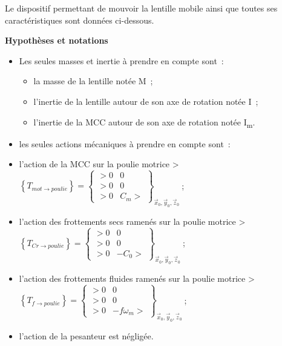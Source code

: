 Le dispositif permettant de mouvoir la lentille mobile ainsi que toutes ses caractéristiques sont données ci-dessous.

\textbf{Hypothèses et notations}

\begin{itemize}
\item
  Les seules masses et inertie à prendre en compte sont~:

  \begin{itemize}
  \item
    la masse de la lentille notée M~;
  \item
    l'inertie de la lentille autour de son axe de rotation notée I~;
  \item
    l'inertie de la MCC autour de son axe de rotation notée I\textsubscript{m}.
  \end{itemize}
\item
  les seules actions mécaniques à prendre en compte sont~:
\end{itemize}

\begin{itemize}
\item
  l'action de la MCC sur la poulie motrice \textgreater{} \(\left\{ T_{mot \rightarrow poulie} \right\} = \begin{Bmatrix} > 0 & 0 \\ > 0 & 0 \\ > 0 & C_{m} > \end{Bmatrix}_{{\overrightarrow{x}}_{0},{\overrightarrow{y}}_{0},{\overrightarrow{z}}_{0}}\ \);
\item
  l'action des frottements secs ramenés sur la poulie motrice \textgreater{} \(\left\{ T_{Cr \rightarrow poulie} \right\} = \begin{Bmatrix} > 0 & 0 \\ > 0 & 0 \\ > 0 & {- C}_{0} > \end{Bmatrix}_{{\overrightarrow{x}}_{0},{\overrightarrow{y}}_{0},{\overrightarrow{z}}_{0}}\ \);
\item
  l'action des frottements fluides ramenés sur la poulie motrice \textgreater{} \(\left\{ T_{f \rightarrow poulie} \right\} = \begin{Bmatrix} > 0 & 0 \\ > 0 & 0 \\ > 0 & {- f\omega}_{m} > \end{Bmatrix}_{{\overrightarrow{x}}_{0},{\overrightarrow{y}}_{0},{\overrightarrow{z}}_{0}}\ \);
\item
  l'action de la pesanteur est négligée.
\end{itemize}

